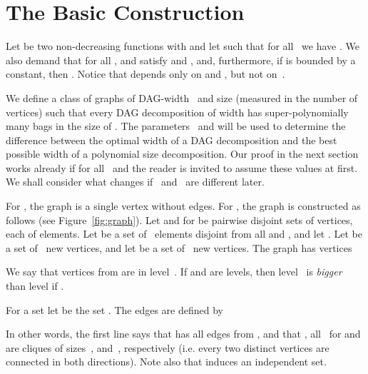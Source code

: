 \documentclass[authoryear]{article}
\makeatletter
\theoremstyle{definition}
\newcommand{\0}{\emptyset}
\newcommand{\dagw}{DAG-{}width\xspace}
\newcommand{\ie}{i.e.\@\xspace}
\makeatother
\begin{document}
\section{The Basic Construction}\label{sec:constr}

Let  be two non-decreasing
functions with  and let 
such that for all~ we have . We also demand that
for all ,  and  satisfy  and  , and,
furthermore, if  is bounded by a constant, then
. Notice that  depends only on  and , but not on~.

We define a class of graphs  of \dagw~ and size
 (measured in the number of vertices)
such that every DAG decomposition of width  has
super-polynomially many bags in the size of . The
parameters~ and  will be used to determine the difference
between the optimal width of a DAG decomposition and the best possible
width of a polynomial size decomposition. Our proof in the next section works already if
 for all~ and the reader is invited to assume
these values at first. We shall consider what changes if~ and~
are different later.

For , the graph  is a single
vertex without edges. For , the graph  is
constructed as follows (see Figure~\ref{fig:graph}).  Let  and  for
 be pairwise disjoint sets of vertices, each of
 elements. Let  be a set of~ elements disjoint from
all  and , and let . Let  be a set
of~ new vertices, and let  be a
set of~ new vertices.  The graph  has vertices

 We say that vertices from 
are in level~. If  and  are levels, then level~ is
\emph{bigger} than level  if .

For a set  let  be the set
. The edges are defined by

In other words, the first line says that  has all edges from
, and that , all~
for  and  are cliques of sizes~, 
and~, respectively (\ie every two distinct vertices are connected in both directions). Note also that  induces an independent set.
\end{document}
